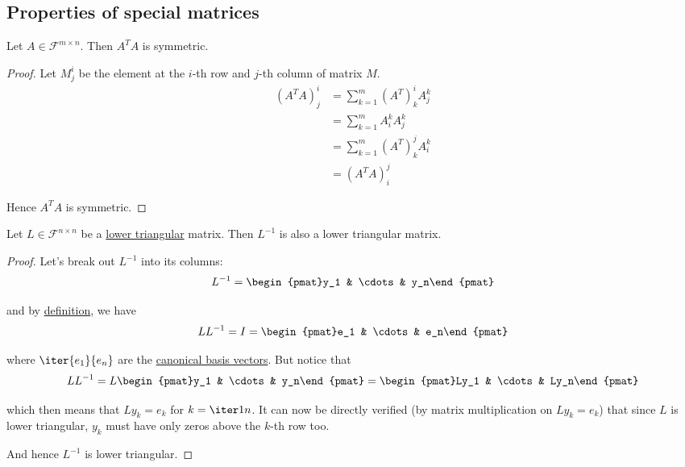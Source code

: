 \subsection{Properties of special matrices}\label{afa6fb7}

\label{a1d41cd}

Let $A\in\mathcal F^{m\times n}$. Then $A^TA$ is symmetric.

\begin{proof}
  Let $M^i_j$ be the element at the $i$-th row and $j$-th column of matrix $M$.
  \begin{align*}
    (A^TA)^i_j &=\sum_{k=1}^m(A^T)^i_kA^k_j \\
               &=\sum_{k=1}^mA^k_iA^k_j     \\
               &=\sum_{k=1}^m(A^T)^j_kA^k_i \\
               &=(A^TA)^j_i
  \end{align*}

  Hence $A^TA$ is symmetric.
\end{proof}

\label{b715552}

Let $L\in\mathcal F^{n\times n}$ be a \href{ce94591}{lower triangular} matrix.
Then $L^{-1}$ is also a lower triangular matrix.

\begin{proof}
  Let's break out $L^{-1}$ into its columns:
  $$
    L^{-1}=\begin{pmat}y_1 & \cdots & y_n\end{pmat}
  $$

  and by \href{ce4daa8}{definition}, we have
  $$
    LL^{-1}=I=\begin{pmat}e_1 & \cdots & e_n\end{pmat}
  $$

  where $\iter{e_1}{e_n}$ are the \href{c01037d}{canonical basis vectors}. But
  notice that
  $$
    LL^{-1}
    =L\begin{pmat}y_1 & \cdots & y_n\end{pmat}
    =\begin{pmat}Ly_1 & \cdots & Ly_n\end{pmat}
  $$

  which then means that $Ly_k=e_k$ for $k=\iter1n$. It can now be directly
  verified (by matrix multiplication on $Ly_k=e_k$) that since $L$ is lower
  triangular, $y_k$ must have only zeros above the $k$-th row too.

  And hence $L^{-1}$ is lower triangular.
\end{proof}

